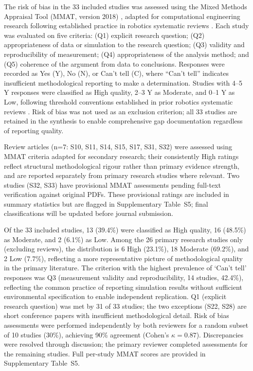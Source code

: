 \documentclass[review,3p,times]{elsarticle}
\begin{document}
The risk of bias in the 33 included studies was assessed using the Mixed Methods Appraisal Tool (MMAT, version 2018) \cite{hong2018}, adapted for computational engineering research following established practice in robotics systematic reviews \cite{brambilla2013}. Each study was evaluated on five criteria: (Q1) explicit research question; (Q2) appropriateness of data or simulation to the research question; (Q3) validity and reproducibility of measurement; (Q4) appropriateness of the analysis method; and (Q5) coherence of the argument from data to conclusions. Responses were recorded as Yes (Y), No (N), or Can't tell (C), where ``Can't tell'' indicates insufficient methodological reporting to make a determination. Studies with 4--5 Y responses were classified as High quality, 2--3 Y as Moderate, and 0--1 Y as Low, following threshold conventions established in prior robotics systematic reviews \cite{brambilla2013,bayindir2016}. Risk of bias was not used as an exclusion criterion; all 33 studies are retained in the synthesis to enable comprehensive gap documentation regardless of reporting quality.

Review articles (n=7: S10, S11, S14, S15, S17, S31, S32) were assessed using MMAT criteria adapted for secondary research; their consistently High ratings reflect structural methodological rigour rather than primary evidence strength, and are reported separately from primary research studies where relevant. Two studies (S32, S33) have provisional MMAT assessments pending full-text verification against original PDFs. These provisional ratings are included in summary statistics but are flagged in Supplementary Table~S5; final classifications will be updated before journal submission.

Of the 33 included studies, 13 (39.4\%) were classified as High quality, 16 (48.5\%) as Moderate, and 2 (6.1\%) as Low. Among the 26 primary research studies only (excluding reviews), the distribution is 6 High (23.1\%), 18 Moderate (69.2\%), and 2 Low (7.7\%), reflecting a more representative picture of methodological quality in the primary literature. The criterion with the highest prevalence of `Can't tell' responses was Q3 (measurement validity and reproducibility, 14 studies, 42.4\%), reflecting the common practice of reporting simulation results without sufficient environmental specification to enable independent replication. Q1 (explicit research question) was met by 31 of 33 studies; the two exceptions (S22, S28) are short conference papers with insufficient methodological detail. Risk of bias assessments were performed independently by both reviewers for a random subset of 10 studies (30\%), achieving 90\% agreement (Cohen's $\kappa=0.87$). Discrepancies were resolved through discussion; the primary reviewer completed assessments for the remaining studies. Full per-study MMAT scores are provided in Supplementary Table~S5.
\end{document}
